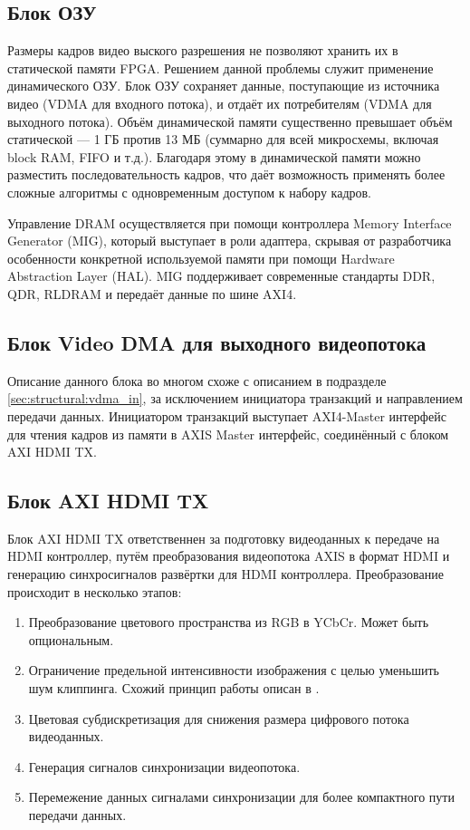 \subsection{Блок ОЗУ}
\label{sec:structural:ram}
Размеры кадров видео выского разрешения не позволяют хранить их в статической памяти FPGA. Решением данной проблемы
служит применение динамического ОЗУ. Блок ОЗУ сохраняет данные, поступающие из источника видео (VDMA для входного потока), и отдаёт
их потребителям (VDMA для выходного потока). Объём динамической памяти существенно превышает объём статической ---
1 ГБ против 13 МБ (суммарно для всей микросхемы, включая block RAM, FIFO и т.д.). Благодаря этому в динамической памяти можно разместить
последовательность кадров, что даёт возможность применять более сложные алгоритмы с одновременным доступом к набору кадров.

Управление DRAM осуществляется при помощи контроллера Memory Interface Generator (MIG), который выступает в роли адаптера, скрывая
от разработчика особенности конкретной используемой памяти при помощи Hardware Abstraction Layer (HAL). MIG поддерживает современные
стандарты DDR, QDR, RLDRAM и передаёт данные по шине AXI4.

\subsection{Блок Video DMA для выходного видеопотока}
\label{sec:structural:vdma_out}
Описание данного блока во многом схоже с описанием в подразделе \ref{sec:structural:vdma_in},
за исключением инициатора транзакций и направлением передачи данных. Инициатором транзакций выступает
AXI4-Master интерфейс для чтения кадров из памяти в AXIS Master интерфейс, соединённый с блоком AXI HDMI TX.

\subsection{Блок AXI HDMI TX}
\label{sec:structural:axi_hdmi_tx}
Блок AXI HDMI TX ответственнен за подготовку видеоданных к передаче на HDMI контроллер, путём
преобразования видеопотока AXIS в формат HDMI и генерацию синхросигналов развёртки для HDMI контроллера.
Преобразование происходит в несколько этапов:
\begin{enumerate}[label={\arabic*}]
  \item Преобразование цветового пространства из RGB в YCbCr. Может быть опциональным.
  \item Ограничение предельной интенсивности изображения с целью уменьшить шум клиппинга.
    Схожий принцип работы описан в \cite{ycbcr_to_rgb_converter}.
  \item Цветовая субдискретизация для снижения размера цифрового потока видеоданных.
  \item Генерация сигналов синхронизации видеопотока.
  \item Перемежение данных сигналами синхронизации для более компактного пути передачи данных.
  \end{enumerate}

